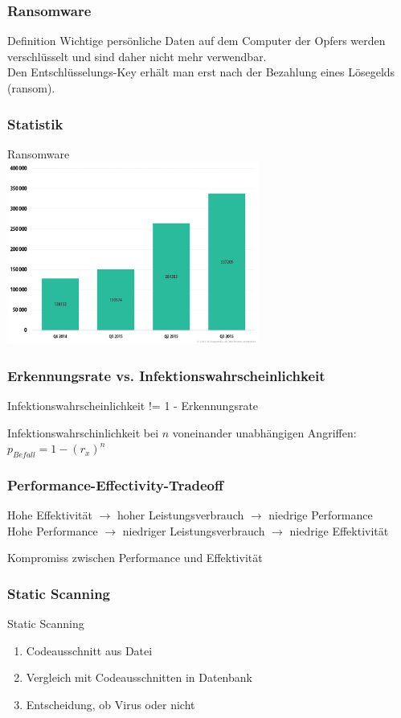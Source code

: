 \documentclass{beamer}
\begin{document}
\begin{frame}
	\frametitle{Ransomware}
	\begin{block}{Definition}
		Wichtige persönliche Daten auf dem Computer der Opfers werden verschlüsselt und sind daher nicht mehr verwendbar.\\
		Den Entschlüsselungs-Key erhält man erst nach der Bezahlung eines Lösegelds (ransom).
	\end{block}
\end{frame}
	

\begin{frame}
\frametitle{Statistik}
Ransomware \\
\includegraphics[height=6cm]{bilder/ransom.png}

\end{frame}


\begin{frame}
\frametitle{Erkennungsrate vs. Infektionswahrscheinlichkeit}
\begin{block}{}
	Infektionswahrscheinlichkeit != 1 - Erkennungsrate
\end{block}
Infektionswahrschinlichkeit bei $n$ voneinander unabhängigen Angriffen: \\
\centering
$p_{Befall} = 1 - (r_x)^n$
\end{frame}

\begin{frame}
\frametitle{Performance-Effectivity-Tradeoff}
Hohe Effektivität $\rightarrow$ hoher Leistungsverbrauch $\rightarrow$ niedrige Performance\\
Hohe Performance $\rightarrow$ niedriger Leistungsverbrauch $\rightarrow$ niedrige Effektivität

\begin{block}{}
	Kompromiss zwischen Performance und Effektivität
\end{block}
\end{frame}


\begin{frame}
\frametitle{Static Scanning}
\begin{block}{Static Scanning}
	\begin{enumerate}
		\item Codeausschnitt aus Datei
		\item Vergleich mit Codeausschnitten in Datenbank
		\item Entscheidung, ob Virus oder nicht
	\end{enumerate}
\end{block} 
\end{frame}
\end{document}
